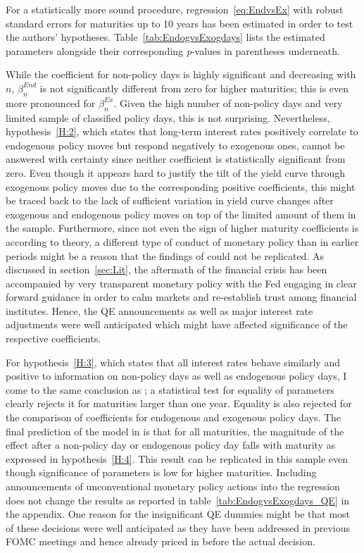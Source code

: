 For a statistically more sound procedure, regression~\eqref{eq:EndvsEx} with robust standard errors for maturities up to 10 years has been estimated in order to test the authors' hypotheses. Table~\vref{tab:EndogvsExogdays} lists the estimated parameters alongside their corresponding \textit{p}-values in parentheses underneath.

%
While the coefficient for non-policy days is highly significant and decreasing with $n$, $\beta_n^{End}$ is not significantly different from zero for higher maturities; this is even more pronounced for $\beta_n^{Ex}$. Given the high number of non-policy days and very limited sample of classified policy days, this is not surprising. Nevertheless, hypothesis~\ref{H:2}, which states that long-term interest rates positively correlate to endogenous policy moves but respond negatively to exogenous ones, cannot be answered with certainty since neither coefficient is statistically significant from zero. Even though it appears hard to justify the tilt of the yield curve through exogenous policy moves due to the corresponding positive coefficients, this might be traced back to the lack of sufficient variation in yield curve changes after exogenous and endogenous policy moves on top of the limited amount of them in the sample. Furthermore, since not even the sign of higher maturity coefficients is according to theory, a different type of conduct of monetary policy than in earlier periods might be a reason that the findings of \textcite{Ellingsen.2003} could not be replicated. As discussed in section~\ref{sec:Lit}, the aftermath of the financial crisis has been accompanied by very transparent monetary policy with the Fed engaging in clear forward guidance in order to calm markets and re-establish trust among financial institutes. Hence, the QE announcements as well as major interest rate adjustments were well anticipated which might have affected significance of the respective coefficients.

For hypothesis~\ref{H:3}, which states that all interest rates behave similarly and positive to information on non-policy days as well as endogenous policy days, I come to the same conclusion as \textcite{Ellingsen.2003}; a statistical test for equality of parameters clearly rejects it for maturities larger than one year. Equality is also rejected for the comparison of coefficients for endogenous and exogenous policy days. The final prediction of the model in \textcite{Ellingsen.2001} is that for all maturities, the magnitude of the effect after a non-policy day or endogenous policy day falls with maturity as expressed in hypothesis~\ref{H:4}. This result can be replicated in this sample even though significance of parameters is low for higher maturities. 
Including announcements of unconventional monetary policy actions into the regression does not change the results as reported in table~\vref{tab:EndogvsExogdays_QE} in the appendix. One reason for the insignificant QE dummies might be that most of these decisions were well anticipated as they have been addressed in previous FOMC meetings and hence already priced in before the actual decision. 

